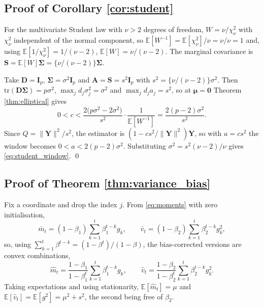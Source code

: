 \documentclass[pdflatex,sn-mathphys-num]{sn-jnl}%
\theoremstyle{thmstyleone}%
\theoremstyle{thmstyletwo}%
\theoremstyle{thmstylethree}%
\newcommand{\tr}{\mathrm{tr}}
\newcommand{\E}{\mathbb{E}}
\begin{document}
\begin{appendices}
\subsection*{Proof of Corollary \ref{cor:student}}

For the multivariate Student law with $\nu>2$ degrees of freedom, $W=\nu/\chi^2_\nu$ with $\chi^2_\nu$ independent of the normal component, so $\E[W^{-1}]=\E[\chi^2_\nu]/\nu=\nu/\nu=1$ and, using $\E[1/\chi^2_\nu]=1/(\nu-2)$, $\E[W]=\nu/(\nu-2)$. The marginal covariance is $\bm S=\E[W]\bm\Sigma=\{\nu/(\nu-2)\}\bm\Sigma$.

Take $\bm D=\bm I_p$, $\bm\Sigma=\sigma^2\bm I_p$ and $\bm A=\bm S=s^2\bm I_p$ with $s^2=\{\nu/(\nu-2)\}\sigma^2$. Then $\tr(\bm D\bm\Sigma)=p\sigma^2$, $\max_jd_j\sigma^2_j=\sigma^2$ and $\max_jd_ja_j=s^2$, so at $\bm\mu=\bm 0$ Theorem \ref{thm:elliptical} gives
\begin{equation}
0<c<\frac{2\bigl(p\sigma^2-2\sigma^2\bigr)}{s^2}\cdot\frac{1}{\E[W^{-1}]}
=\frac{2(p-2)\sigma^2}{s^2} .
\end{equation}
Since $Q=\|\bm Y\|^2/s^2$, the estimator is $(1-cs^2/\|\bm Y\|^2)\bm Y$, so with $a=cs^2$ the window becomes $0<a<2(p-2)\sigma^2$. Substituting $\sigma^2=s^2(\nu-2)/\nu$ gives \eqref{eq:student_window}. \qed

\subsection*{Proof of Theorem \ref{thm:variance_bias}}

Fix a coordinate and drop the index $j$. From \eqref{eq:moments} with zero initialisation,
\begin{equation}
\bar m_t=(1-\beta_1)\sum_{k=1}^{t}\beta_1^{t-k}g_k,
\qquad
\bar v_t=(1-\beta_2)\sum_{k=1}^{t}\beta_2^{t-k}g^2_k ,
\end{equation}
so, using $\sum_{k=1}^{t}\beta^{t-k}=(1-\beta^{t})/(1-\beta)$, the bias-corrected versions are convex combinations,
\begin{equation}
\hat m_t=\frac{1-\beta_1}{1-\beta_1^{t}}\sum_{k=1}^{t}\beta_1^{t-k}g_k,
\qquad
\hat v_t=\frac{1-\beta_2}{1-\beta_2^{t}}\sum_{k=1}^{t}\beta_2^{t-k}g^2_k .
\end{equation}
Taking expectations and using stationarity, $\E[\hat m_t]=\mu$ and $\E[\hat v_t]=\E[g^2]=\mu^2+s^2$, the second being free of $\beta_2$.


\end{appendices}
\end{document}
